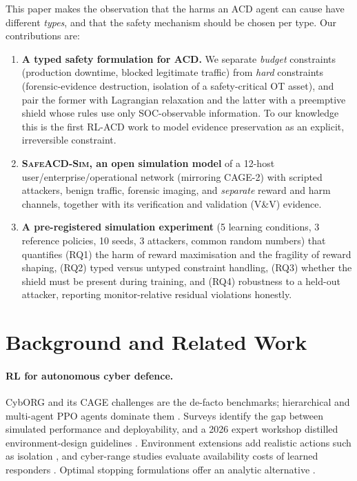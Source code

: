 \documentclass[10pt]{article}
\newcommand{\safeacd}{\textsc{SafeACD-Sim}}
\begin{document}
This paper makes the observation that the harms an ACD agent can cause have
different \emph{types}, and that the safety mechanism should be chosen per
type. Our contributions are:
\begin{enumerate}
\item \textbf{A typed safety formulation for ACD.} We separate \emph{budget}
constraints (production downtime, blocked legitimate traffic) from \emph{hard}
constraints (forensic-evidence destruction, isolation of a safety-critical OT
asset), and pair the former with Lagrangian relaxation and the latter with a
preemptive shield \citep{alshiekh2018shielding} whose rules use only
SOC-observable information. To our knowledge this is the first RL-ACD work to
model evidence preservation as an explicit, irreversible constraint.
\item \textbf{\safeacd{}, an open simulation model} of a 12-host
user/enterprise/operational network (mirroring CAGE-2) with scripted
attackers, benign traffic, forensic imaging, and \emph{separate} reward and
harm channels, together with its verification and validation (V\&V) evidence.
\item \textbf{A pre-registered simulation experiment} (5 learning conditions,
3 reference policies, 10 seeds, 3 attackers, common random numbers) that
quantifies (RQ1) the harm of reward maximisation and the fragility of reward
shaping, (RQ2) typed versus untyped constraint handling, (RQ3) whether the
shield must be present during training, and (RQ4) robustness to a held-out
attacker, reporting monitor-relative residual violations honestly.
\end{enumerate}

\section{Background and Related Work}
\paragraph{RL for autonomous cyber defence.}
CybORG and its CAGE challenges \citep{standen2021cyborg,kiely2025cage4} are
the de-facto benchmarks; hierarchical and multi-agent PPO agents dominate them
\citep{foley2022autonomous}. Surveys \citep{vyas2023review,palmer2023survey,kott2023aica}
identify the gap between simulated performance and deployability, and a 2026
expert workshop distilled environment-design guidelines
\citep{envworkshop2026}. Environment extensions add realistic actions such as
isolation \citep{tholl2025production}, and cyber-range studies evaluate
availability costs of learned responders \citep{nyberg2026range}. Optimal
stopping formulations offer an analytic alternative \citep{hammar2022stopping}.
\end{document}
